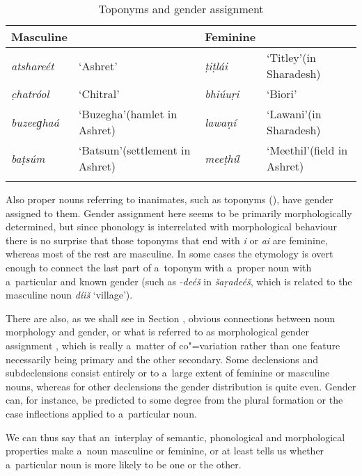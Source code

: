 \begin{table}[ht]
\caption{Toponyms and gender assignment}
\begin{tabularx}{\textwidth}{ l Q l Q }
\lsptoprule
Masculine &
&
Feminine &
\\\hline
\textit{atshareét} &
`Ashret' &
\textit{ṭiṭlái} &
`Titley'\newline (in Sharadesh)\\
\textit{c̣hatróol} &
`Chitral' &
\textit{bhiúuṛi} &
`Biori'\\
\textit{buzeeɡhaá} &
`Buzegha'\newline (hamlet in Ashret) &
\textit{lawaṇí} &
`Lawani'\newline (in Sharadesh)\\
\textit{baṭsúm} &
`Batsum'\newline (settlement in Ashret) &
\textit{meeṭhíl} &
`Meethil'\newline (field in Ashret)\\\lspbottomrule
\end{tabularx}
\label{tab:4-3}
\end{table}


Also proper nouns referring to inanimates, such as toponyms (), have gender assigned to them. Gender assignment here seems to be primarily morphologically determined, but since phonology is interrelated with morphological behaviour there is no surprise that those toponyms that end with \textit{i} or \textit{ai} are feminine, whereas most of the rest are masculine. In some cases the etymology is overt enough to connect the last part of a~toponym with a~proper noun with a~particular and known gender (such as \textit{-deéš} in \textit{šaṛadeéš}, which is related to the masculine noun \textit{díiš} `village').


There are also, as we shall see in Section , obvious connections between noun morphology and gender, or what is referred to as morphological gender assignment \citep[34--50]{corbett1991}, which is really a~matter of co"=variation rather than one feature necessarily being primary and the other secondary. Some declensions and subdeclensions consist entirely or to a~large extent of feminine or masculine nouns, whereas for other declensions the gender distribution is quite even. Gender can, for instance, be predicted to some degree from the plural formation or the case inflections applied to a~particular noun.


We can thus say that an~interplay of semantic, phonological and morphological properties make a~noun masculine or feminine, or at least tells us whether a~particular noun is more likely to be one or the other. 


